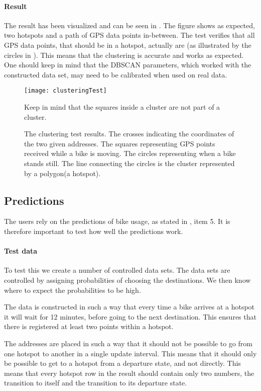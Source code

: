 \paragraph{Result}
The result has been visualized and can be seen in .
The figure shows as expected, two hotspots and a path of GPS data points in-between.
The test verifies that all GPS data points, that should be in a hotspot, actually are (as illustrated by the circles in ).
This means that the clustering is accurate and works as expected.
One should keep in mind that the DBSCAN parameters, which worked with the constructed data set, may need to be calibrated when used on real data.

\begin{figure}
\texttt{[image: clusteringTest]}
\caption{The clustering test results. 
The crosses indicating the coordinates of the two given addresses. The squares representing GPS points received while a bike is moving. The circles representing when a bike stands still. The line connecting the circles is the cluster represented by a polygon(a hotspot).}
 Keep in mind that the squares inside a cluster are not part of a cluster.
\label{fig:test:clustering}
\end{figure}

\subsection{Predictions}
The users rely on the predictions of bike usage, as stated in , item 5.
It is therefore important to test how well the predictions work.

\paragraph{Test data} To test this we create a number of controlled data sets.
The data sets are controlled by assigning probabilities of choosing the destinations. 
We then know where to expect the probabilities to be high.

The data is constructed in such a way that every time a bike arrives at a hotspot it will wait for 12 minutes, before going to the next destination.
This ensures that there is registered at least two points within a hotspot.

The addresses are placed in such a way that it should not be possible to go from one hotspot to another in a single update interval.
This means that it should only be possible to get to a hotspot from a departure state, and not directly.
This means that every hotspot row in the result should contain only two numbers, the transition to itself and the transition to its departure state.

